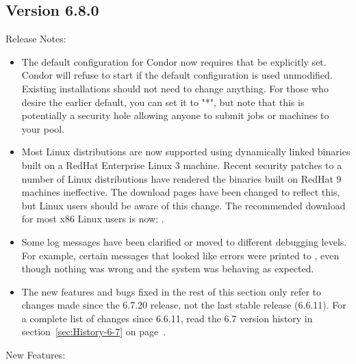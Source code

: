 \subsection*{\label{sec:New-6-8-0}Version 6.8.0}

\noindent Release Notes:

\begin{itemize}

\item The default configuration for Condor now requires that
 be explicitly set.  Condor will refuse
to start if the default configuration is used unmodified.
Existing installations should not need to change anything.  For
those who desire the earlier default, you can set it to "*", but
note that this is potentially a security hole allowing anyone to
submit jobs or machines to your pool.

\item Most Linux distributions are now supported using dynamically
  linked binaries built on a RedHat Enterprise Linux 3 machine.
  Recent security patches to a number of Linux distributions have
  rendered the binaries built on RedHat 9 machines ineffective.
  The download pages have been changed to reflect this, but Linux users
  should be aware of this change.
  The recommended download for most x86 Linux users is now:
  .

\item Some log messages have been clarified or moved to different
  debugging levels.
  For example, certain messages that looked like errors were printed
  to , even though nothing was wrong and the system was
  behaving as expected.

\item The new features and bugs fixed in the rest of this section only
  refer to changes made since the 6.7.20 release, not the last stable
  release (6.6.11).
  For a complete list of changes since 6.6.11, read the 6.7 version
  history in section~\ref{sec:History-6-7} on
  page~\pageref{sec:History-6-7}. 

\end{itemize}


\noindent New Features:

